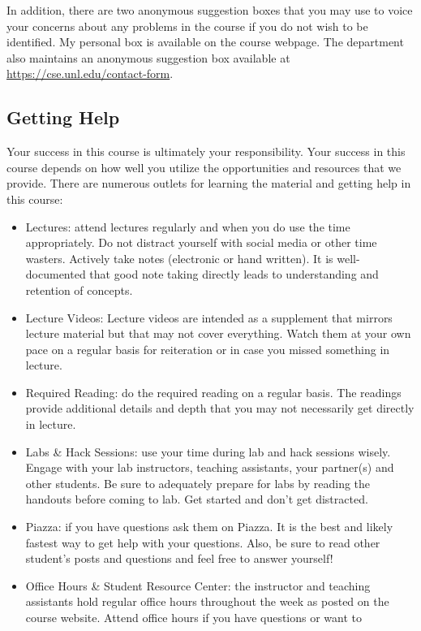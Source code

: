 \documentclass[12pt]{scrartcl}
\begin{document}
In addition, there are two anonymous suggestion boxes that you may 
use to voice your concerns about any problems in the course if you 
do not wish to be identified.  My personal box is available on the
course webpage.  The department also maintains an anonymous suggestion
box available at \url{https://cse.unl.edu/contact-form}.

\subsection{Getting Help}

Your success in this course is ultimately your responsibility.  Your
success in this course depends on how well you utilize the opportunities
and resources that we provide.  There are numerous outlets for learning
the material and getting help in this course:
\begin{itemize}
  \item Lectures: attend lectures regularly and when you do use the 
  time appropriately.  Do not distract yourself with social media or other
  time wasters.  Actively take notes (electronic or hand written).  It is
  well-documented that good note taking directly leads to understanding and
  retention of concepts.
  \item Lecture Videos: Lecture videos are intended as a supplement
  that mirrors lecture material but that may not cover everything.  Watch
  them at your own pace on a regular basis for reiteration or in case
  you missed something in lecture.  
  \item Required Reading: do the required reading on a regular basis.  The
  readings provide additional details and depth that you may not necessarily
  get directly in lecture.  
  \item Labs \& Hack Sessions: use your time during lab and hack sessions 
  wisely.  Engage with your lab instructors, teaching assistants, your partner(s)
  and other students.  Be sure to adequately prepare for labs by reading
  the handouts before coming to lab.  Get started and don't get distracted.
  \item Piazza: if you have questions ask them on Piazza.  It is the best and
  likely fastest way to get help with your questions.  Also, be sure to read
  other student's posts and questions and feel free to answer yourself!
  \item Office Hours \& Student Resource Center: the instructor and teaching
  assistants hold regular office hours throughout the week as posted on the
  course website.  Attend office hours if you have questions or want to 

\end{itemize}
\end{document}
